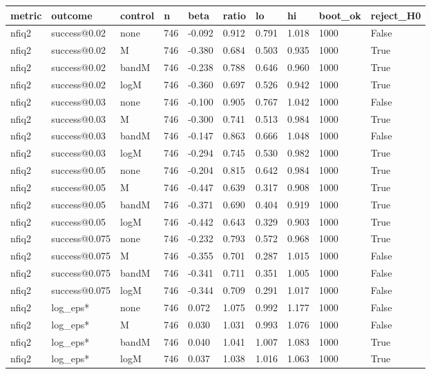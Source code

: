 \begin{tabular}{llllllllll}
\hline
metric & outcome & control & n & beta & ratio & lo & hi & boot\_ok & reject\_H0 \\
\hline
nfiq2 & success@0.02 & none & 746 & -0.092 & 0.912 & 0.791 & 1.018 & 1000 & False \\
nfiq2 & success@0.02 & M & 746 & -0.380 & 0.684 & 0.503 & 0.935 & 1000 & True \\
nfiq2 & success@0.02 & bandM & 746 & -0.238 & 0.788 & 0.646 & 0.960 & 1000 & True \\
nfiq2 & success@0.02 & logM & 746 & -0.360 & 0.697 & 0.526 & 0.942 & 1000 & True \\
nfiq2 & success@0.03 & none & 746 & -0.100 & 0.905 & 0.767 & 1.042 & 1000 & False \\
nfiq2 & success@0.03 & M & 746 & -0.300 & 0.741 & 0.513 & 0.984 & 1000 & True \\
nfiq2 & success@0.03 & bandM & 746 & -0.147 & 0.863 & 0.666 & 1.048 & 1000 & False \\
nfiq2 & success@0.03 & logM & 746 & -0.294 & 0.745 & 0.530 & 0.982 & 1000 & True \\
nfiq2 & success@0.05 & none & 746 & -0.204 & 0.815 & 0.642 & 0.984 & 1000 & True \\
nfiq2 & success@0.05 & M & 746 & -0.447 & 0.639 & 0.317 & 0.908 & 1000 & True \\
nfiq2 & success@0.05 & bandM & 746 & -0.371 & 0.690 & 0.404 & 0.919 & 1000 & True \\
nfiq2 & success@0.05 & logM & 746 & -0.442 & 0.643 & 0.329 & 0.903 & 1000 & True \\
nfiq2 & success@0.075 & none & 746 & -0.232 & 0.793 & 0.572 & 0.968 & 1000 & True \\
nfiq2 & success@0.075 & M & 746 & -0.355 & 0.701 & 0.287 & 1.015 & 1000 & False \\
nfiq2 & success@0.075 & bandM & 746 & -0.341 & 0.711 & 0.351 & 1.005 & 1000 & False \\
nfiq2 & success@0.075 & logM & 746 & -0.344 & 0.709 & 0.291 & 1.017 & 1000 & False \\
nfiq2 & log\_eps* & none & 746 & 0.072 & 1.075 & 0.992 & 1.177 & 1000 & False \\
nfiq2 & log\_eps* & M & 746 & 0.030 & 1.031 & 0.993 & 1.076 & 1000 & False \\
nfiq2 & log\_eps* & bandM & 746 & 0.040 & 1.041 & 1.007 & 1.083 & 1000 & True \\
nfiq2 & log\_eps* & logM & 746 & 0.037 & 1.038 & 1.016 & 1.063 & 1000 & True \\

\end{tabular}
